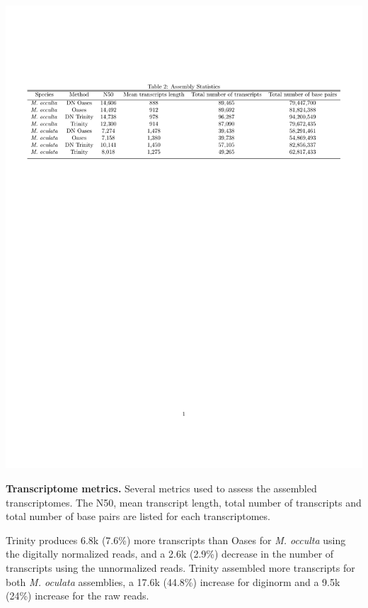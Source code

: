 \begin{table}[tbp]
\centering
\includegraphics[width=\linewidth]{manuscript/Table2.pdf}
\caption{\textbf{Transcriptome metrics.} Several metrics used to assess the assembled transcriptomes. The N50, mean transcript length, total number of transcripts and total number of base pairs are listed for each transcriptomes.}
\label{fig:Table2.pdf}
\end{table}
   
Trinity produces 6.8k (7.6\%) more transcripts than Oases for \textit{M. occulta} using the digitally normalized reads, and a 2.6k (2.9\%) decrease in the number of transcripts using the unnormalized reads. Trinity assembled more transcripts for both \textit{M. oculata} assemblies, a 17.6k (44.8\%) increase for diginorm and a 9.5k (24\%) increase for the raw reads. 

